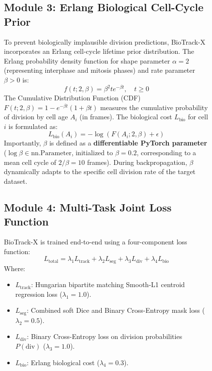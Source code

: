 \documentclass[10pt,journal,compsoc]{IEEEtran}
\begin{document}
\begin{figure}[t]
\subsection{Module 3: Erlang Biological Cell-Cycle Prior}
To prevent biologically implausible division predictions, BioTrack-X incorporates an Erlang cell-cycle lifetime prior distribution. The Erlang probability density function for shape parameter $\alpha = 2$ (representing interphase and mitosis phases) and rate parameter $\beta > 0$ is:
\begin{equation}
f(t; 2, \beta) = \beta^2 t e^{-\beta t}, \quad t \ge 0
\end{equation}
The Cumulative Distribution Function (CDF) $F(t; 2, \beta) = 1 - e^{-\beta t}(1 + \beta t)$ measures the cumulative probability of division by cell age $A_i$ (in frames). The biological cost $L_{\text{bio}}$ for cell $i$ is formulated as:
\begin{equation}
L_{\text{bio}}(A_i) = -\log \left( F(A_i; 2, \beta) + \epsilon \right)
\end{equation}
Importantly, $\beta$ is defined as a \textbf{differentiable PyTorch parameter} ($\log \beta \in \text{nn.Parameter}$, initialized to $\beta=0.2$, corresponding to a mean cell cycle of $2/\beta = 10$ frames). During backpropagation, $\beta$ dynamically adapts to the specific cell division rate of the target dataset.

\subsection{Module 4: Multi-Task Joint Loss Function}
BioTrack-X is trained end-to-end using a four-component loss function:
\begin{equation}
L_{\text{total}} = \lambda_1 L_{\text{track}} + \lambda_2 L_{\text{seg}} + \lambda_3 L_{\text{div}} + \lambda_4 L_{\text{bio}}
\end{equation}
Where:
\begin{itemize}
    \item $L_{\text{track}}$: Hungarian bipartite matching Smooth-L1 centroid regression loss ($\lambda_1 = 1.0$).
    \item $L_{\text{seg}}$: Combined soft Dice and Binary Cross-Entropy mask loss ($\lambda_2 = 0.5$).
    \item $L_{\text{div}}$: Binary Cross-Entropy loss on division probabilities $P(\text{div})$ ($\lambda_3 = 1.0$).
    \item $L_{\text{bio}}$: Erlang biological cost ($\lambda_4 = 0.3$).
\end{itemize}


\end{figure}
\end{document}
